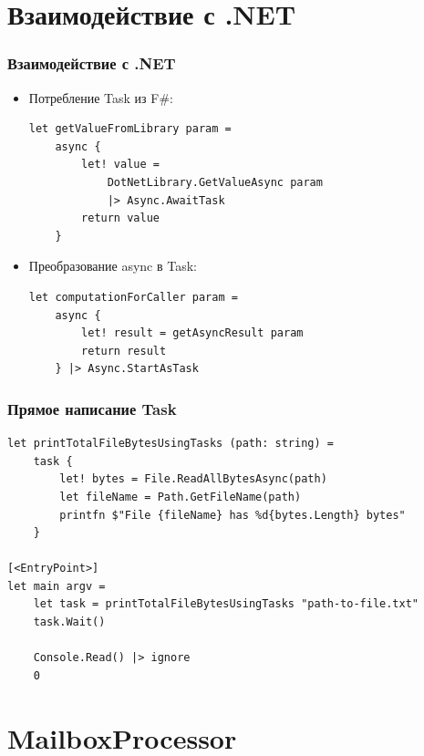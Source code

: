 \documentclass{../../slides-style}
\begin{document}
    \section{Взаимодействие с .NET}

    \begin{frame}[fragile]
        \frametitle{Взаимодействие с .NET}
        \begin{itemize}
            \item Потребление Task из F\#:
            \begin{verbatim}
let getValueFromLibrary param =
    async {
        let! value = 
            DotNetLibrary.GetValueAsync param 
            |> Async.AwaitTask
        return value
    }
            \end{verbatim}
            \item Преобразование async в Task:
            \begin{verbatim}
let computationForCaller param =
    async {
        let! result = getAsyncResult param
        return result
    } |> Async.StartAsTask
            \end{verbatim}
        \end{itemize}
    \end{frame}

    \begin{frame}[fragile]
        \frametitle{Прямое написание Task}
        \begin{verbatim}
let printTotalFileBytesUsingTasks (path: string) =
    task {
        let! bytes = File.ReadAllBytesAsync(path)
        let fileName = Path.GetFileName(path)
        printfn $"File {fileName} has %d{bytes.Length} bytes"
    }

[<EntryPoint>]
let main argv =
    let task = printTotalFileBytesUsingTasks "path-to-file.txt"
    task.Wait()

    Console.Read() |> ignore
    0
        \end{verbatim}
    \end{frame}

    \section{MailboxProcessor}
\end{document}
